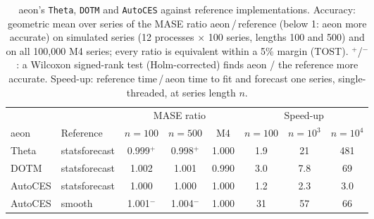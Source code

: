 \begin{table}[t]
\centering
\caption{aeon's \texttt{Theta}, \texttt{DOTM} and \texttt{AutoCES} against
reference implementations. Accuracy: geometric mean over series of the MASE
ratio aeon\,/\,reference (below 1: aeon more accurate) on simulated series
(12 processes $\times$ 100 series, lengths 100 and 500) and on all 100{,}000 M4
series; every ratio is equivalent within a 5\% margin (TOST). $^{+}$/$^{-}$: a
Wilcoxon signed-rank test (Holm-corrected) finds aeon / the reference more
accurate. Speed-up: reference time\,/\,aeon time to fit and forecast one series,
single-threaded, at series length $n$.}
\label{tab:other_stats}
\setlength{\tabcolsep}{4pt}
\begin{tabular}{llcccccc}
\toprule
 & & \multicolumn{3}{c}{MASE ratio} & \multicolumn{3}{c}{Speed-up} \\
\cmidrule(lr){3-5}\cmidrule(lr){6-8}
aeon & Reference & $n{=}100$ & $n{=}500$ & M4 & $n{=}100$ & $n{=}10^3$ & $n{=}10^4$ \\
\midrule
Theta   & statsforecast & 0.999$^{+}$ & 0.998$^{+}$ & 1.000 & 1.9  & 21 & 481 \\
DOTM    & statsforecast & 1.002       & 1.001       & 0.990 & 3.0  & 7.8 & 69 \\
AutoCES & statsforecast & 1.000       & 1.000       & 1.000 & 1.2  & 2.3  & 3.0 \\
AutoCES & smooth        & 1.001$^{-}$ & 1.004$^{-}$ & 1.000 & 31 & 57 & 66 \\
\bottomrule
\end{tabular}
\end{table}
